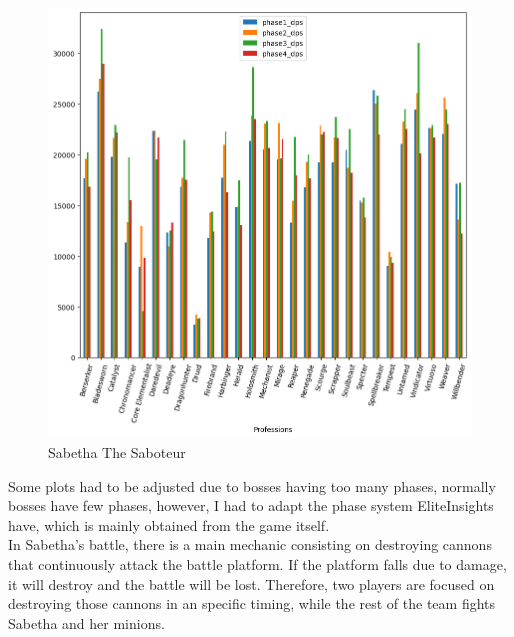 \documentclass[12pt,a4paper]{article}
\begin{document}
    \newpage

    \begin{figure}[h!]
        
        \centering
        
        \includegraphics[width=1 \linewidth]{sab_dps_plot.png}
        \caption{Sabetha The Saboteur}
    \end{figure}

    Some plots had to be adjusted due to bosses having too many phases, normally bosses have few phases,
    however, I had to adapt the phase system EliteInsights have, which is mainly obtained from the game
    itself.\\

    In Sabetha's battle, there is a main mechanic consisting on destroying cannons that continuously attack
    the battle platform. If the platform falls due to damage, it will destroy and the battle will be lost.
    Therefore, two players are focused on destroying those cannons in an specific timing, while the rest of
    the team fights Sabetha and her minions.

    \newpage
\end{document}
